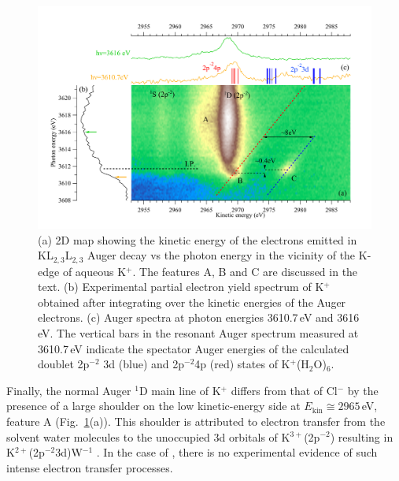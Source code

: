 \begin{figure}[h!]
\centering
\includegraphics[scale=0.55]{figures/k_2dmap.pdf}
\caption{(a) 2D map showing the kinetic energy of the electrons emitted in KL$_{2,3}$L$_{2,3}$ Auger decay vs the photon energy in the vicinity of the K-edge of aqueous K$^{+}$. The features A, B and C are discussed in the text.
(b) Experimental partial electron yield spectrum of K$^{+}$ obtained after integrating over the kinetic energies of the Auger electrons.
(c) Auger spectra at photon energies 3610.7\,eV and 3616\,eV. The vertical bars in the resonant Auger spectrum measured at 3610.7\,eV indicate the spectator Auger energies of the calculated doublet 2p$^{-2}$ 3d (blue) and 2p$^{-2}$4p (red) states of K$^{+}$(H$_2$O)$_6$.}
\label{fg:2dmap_k}
\end{figure}


Finally, the normal Auger $^1$D main line of K$^{+}$ differs from that of Cl$^{-}$ by the presence of a large shoulder on the low kinetic-energy side at $E_{\text{kin}} \cong 2965$\,eV, feature A (Fig.\ \ref{fg:2dmap_k}(a)). This shoulder is attributed to electron transfer from the solvent water molecules to the unoccupied 3d orbitals of K$^{3+}$(2p$^{-2}$) resulting in K$^{2+}$(2p$^{-2}$3d)W$^{-1}$ \citep{ceolin17:263003}. In the case of \cli, there is no experimental evidence of such intense electron transfer processes.


